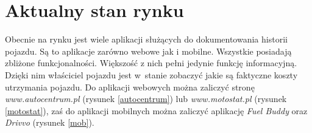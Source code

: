 \documentclass[12pt]{article}
\begin{document}
\section{Aktualny stan rynku }
	
Obecnie na rynku jest wiele aplikacji służących do dokumentowania historii pojazdu. Są to aplikacje zarówno webowe jak i mobilne. Wszystkie posiadają zbliżone funkcjonalności. Większość z nich pełni jedynie funkcję informacyjną. Dzięki nim właściciel pojazdu jest w~stanie zobaczyć jakie są faktyczne koszty utrzymania pojazdu. Do aplikacji webowych można zaliczyć stronę \textit{www.autocentrum.pl} (rysunek \ref{autocentrum}) lub \textit{www.motostat.pl} (rysunek \ref{motostat}), zaś do aplikacji mobilnych można zaliczyć aplikację \textit{Fuel Buddy} oraz \textit{Drivvo} (rysunek \ref{mob}). \\
\end{document}
